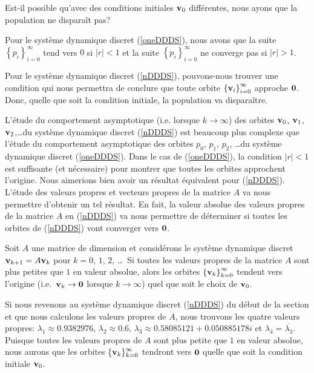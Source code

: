 {\begin{egg}
Est-il possible qu'avec des conditions initiales $\mathbf{v}_0$
différentes, nous ayons que la population ne disparaît pas?

Pour le système dynamique discret (\ref{oneDDDS}), nous avons que la suite
$\displaystyle \left\{p_i\right\}_{i=0}^\infty$ tend vers $0$ si
$|r|<1$ et la suite $\displaystyle \left\{p_i\right\}_{i=0}^\infty$ ne
converge pas si $|r| > 1$.  

Pour le système dynamique discret (\ref{nDDDS}), pouvons-nous trouver une
condition qui nous permettra de conclure que toute orbite
$\displaystyle \left\{\mathbf{v}_i\right\}_{i=0}^\infty$ approche
$\mathbf{0}$. Donc, quelle que soit la condition initiale, la population
va disparaître.
\label{alglinpopeg}
\end{egg}

L'étude du comportement asymptotique (i.e. lorsque
$k\rightarrow \infty$) des orbites $\mathbf{v}_0$, $\mathbf{v}_1$,
$\mathbf{v}_2$,\ldots du système dynamique discret (\ref{nDDDS}) est
beaucoup plus complexe que l'étude du comportement asymptotique des
orbites $p_0$, $p_1$, $p_2$, \ldots du système dynamique discret
(\ref{oneDDDS}).  Dans le cas de (\ref{oneDDDS}), la condition $|r|<1$
est suffisante (et nécessaire) pour montrer que toutes les orbites
approchent l'origine.  Nous aimerions bien avoir un résultat équivalent
pour (\ref{nDDDS}).  L'étude des
valeurs propres et vecteurs propres de la matrice $A$ va nous
permettre d'obtenir un tel résultat.  En fait, la valeur absolue des
valeurs propres de la matrice $A$ en (\ref{nDDDS}) va nous permettre
de déterminer si toutes les orbites de (\ref{nDDDS}) vont converger
vers $\mathbf{0}$.

\begin{focus}{\prp}
Soit $A$ une matrice de dimension \nn et considérons le système
dynamique discret $\mathbf{v}_{k+1} = A \mathbf{v}_k$ pour $k=0$, $1$, $2$,
\ldots\   Si toutes les valeurs propres de la matrice $A$ sont
plus petites que $1$ en valeur absolue, alors les orbites
$\displaystyle \left\{ \mathbf{v}_k \right\}_{k=0}^\infty$ tendent vers
l'origine (i.e.\ $\mathbf{v}_k\rightarrow \mathbf{0}$ lorsque 
$k\rightarrow \infty$) quel que soit le choix de $\mathbf{v}_0$.
\end{focus}

\begin{egg}
Si nous revenons au système dynamique discret (\ref{nDDDS}) du début de
la section et que nous calculons les valeurs propres de $A$,
nous trouvons les quatre valeurs propres: $\lambda_1 \approx 0.9382976$,
$\lambda_2 \approx 0.6$, $\lambda_3 \approx 0.58085121 + 0.050885178 i$
et $\lambda_4 = \overline{\lambda_3}$.  Puisque toutes les valeurs
propres de $A$ sont plus petite que $1$ en valeur absolue, nous aurons que
les orbites $\displaystyle \{\mathbf{v}_k\}_{k=0}^\infty$ tendront vers
$\mathbf{0}$ quelle que soit la condition initiale $\mathbf{v}_0$.
\end{egg}

}
